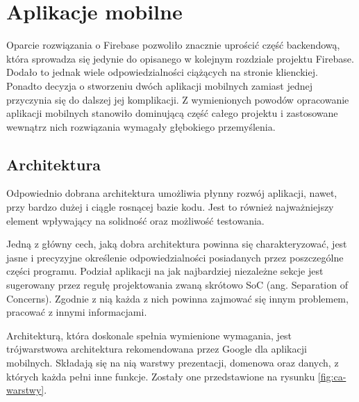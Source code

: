 \chapter{Aplikacje mobilne}
\label{part:applications}

Oparcie rozwiązania o Firebase pozwoliło znacznie uprościć część backendową, która sprowadza się jedynie do opisanego w kolejnym rozdziale projektu Firebase. Dodało to jednak wiele odpowiedzialności ciążących na stronie klienckiej. Ponadto decyzja o stworzeniu dwóch aplikacji mobilnych zamiast jednej przyczynia się do dalszej jej komplikacji. Z wymienionych powodów opracowanie aplikacji mobilnych stanowiło dominującą część całego projektu i zastosowane wewnątrz nich rozwiązania wymagały głębokiego przemyślenia.


\section{Architektura}

Odpowiednio dobrana architektura umożliwia płynny rozwój aplikacji, nawet, przy bardzo dużej i ciągle rosnącej bazie kodu. Jest to również najważniejszy element wpływający na solidność oraz możliwość testowania.

Jedną z główny cech, jaką dobra architektura powinna się charakteryzować, jest jasne i precyzyjne określenie odpowiedzialności posiadanych przez poszczególne części programu. Podział aplikacji na jak najbardziej niezależne sekcje jest sugerowany przez regułę projektowania zwaną skrótowo SoC (ang. Separation of Concerns). Zgodnie z nią każda z nich powinna zajmować się innym problemem, pracować z innymi informacjami.

Architekturą, która doskonale spełnia wymienione wymagania, jest trójwarstwowa architektura rekomendowana przez Google dla aplikacji mobilnych. Składają się na nią warstwy prezentacji, domenowa oraz danych, z których każda pełni inne funkcje. Zostały one przedstawione na rysunku \ref{fig:ca-warstwy}.

